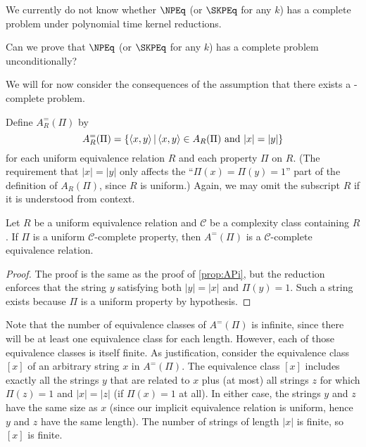 We currently do not know whether $\NPEq$ (or $\SKPEq$ for any $k$) has a complete problem under polynomial time kernel reductions.
\begin{openproblem}
  Can we prove that $\NPEq$ (or $\SKPEq$ for any $k$) has a complete problem unconditionally?
\end{openproblem}

We will for now consider the consequences of the assumption that there exists a \CEq-complete problem.

Define $A_R^=(\Pi)$ by
\begin{displaymath}
  A_R^=(\Pi) = \left\{ \left\langle x,y\right\rangle \,\middle|\, \left\langle x,y\right\rangle\in A_R(\Pi) \text{ and } |x| = |y|\right\}
\end{displaymath}
for each uniform equivalence relation $R$ and each property $\Pi$ on $R$.
(The requirement that $|x| = |y|$ only affects the ``$\Pi(x) = \Pi(y) = 1$'' part of the definition of $A_R(\Pi)$, since $R$ is uniform.)
Again, we may omit the subscript $R$ if it is understood from context.

\begin{proposition}\label{prop:APieq}
  Let $R$ be a uniform equivalence relation and $\mathcal{C}$ be a complexity class containing $R$.
  If $\Pi$ is a uniform $\mathcal{C}$-complete property, then $A^=(\Pi)$ is a $\mathcal{C}$-complete equivalence relation.
\end{proposition}
\begin{proof}
  The proof is the same as the proof of \autoref{prop:APi}, but the reduction enforces that the string $y$ satisfying both $|y| = |x|$ and $\Pi(y) = 1$.
  Such a string exists because $\Pi$ is a uniform property by hypothesis.
\end{proof}

Note that the number of equivalence classes of $A^=(\Pi)$ is infinite, since there will be at least one equivalence class for each length.
However, each of those equivalence classes is itself finite.
As justification, consider the equivalence class $[x]$ of an arbitrary string $x$ in $A^=(\Pi)$.
The equivalence class $[x]$ includes exactly all the strings $y$ that are related to $x$ plus (at most) all strings $z$ for which $\Pi(z) = 1$ and $|x| = |z|$ (if $\Pi(x) = 1$ at all).
In either case, the strings $y$ and $z$ have the same size as $x$ (since our implicit equivalence relation is uniform, hence $y$ and $z$ have the same length).
The number of strings of length $|x|$ is finite, so $[x]$ is finite.

